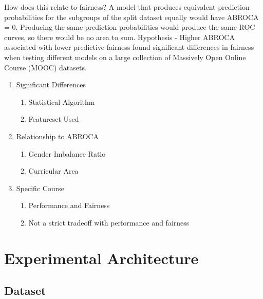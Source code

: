 \documentclass{article}
\begin{document}
                How does this relate to fairness?
                A model that produces equivalent prediction probabilities for the subgroups of the split dataset equally would have ABROCA = 0. 
                Producing the same prediction probabilities would produce the same ROC curves, so there would be no area to sum.
                Hypothesis - Higher ABROCA associated with lower predictive fairness
                \cite{eval2019} found significant differences in fairness when testing different models on a large collection of Massively Open Online Course (MOOC) datasets.
                \begin{enumerate}
                    \item Significant Differences
                    \begin{enumerate}
                        \item Statistical Algorithm
                        \item Featureset Used
                    \end{enumerate}
                    \item Relationship to ABROCA
                    \begin{enumerate}
                        \item Gender Imbalance Ratio
                        \item Curricular Area
                    \end{enumerate}
                    \item Specific Course
                    \begin{enumerate}
                        \item Performance and Fairness
                        \item Not a strict tradeoff with performance and fairness
                    \end{enumerate}
                \end{enumerate}
    
\section{Experimental Architecture}
    \subsection{Dataset}
\end{document}
